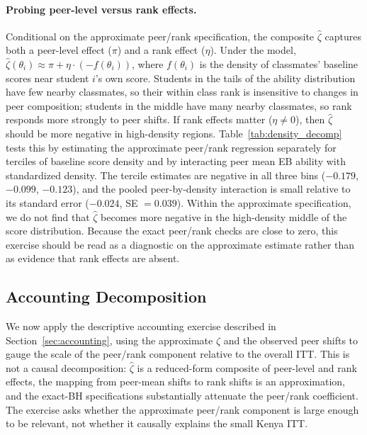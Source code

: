 \documentclass[11pt]{article}
\begin{document}
\paragraph{Probing peer-level versus rank effects.} Conditional on the approximate peer/rank specification, the composite $\hat{\zeta}$ captures both a peer-level effect ($\pi$) and a rank effect ($\eta$). Under the model, $\hat{\zeta}(\theta_i) \approx \pi + \eta \cdot (-f(\theta_i))$, where $f(\theta_i)$ is the density of classmates' baseline scores near student $i$'s own score. Students in the tails of the ability distribution have few nearby classmates, so their within class rank is insensitive to changes in peer composition; students in the middle have many nearby classmates, so rank responds more strongly to peer shifts. If rank effects matter ($\eta \neq 0$), then $\hat{\zeta}$ should be more negative in high-density regions. Table~\ref{tab:density_decomp} tests this by estimating the approximate peer/rank regression separately for terciles of baseline score density and by interacting peer mean EB ability with standardized density. The tercile estimates are negative in all three bins ($-0.179$, $-0.099$, $-0.123$), and the pooled peer-by-density interaction is small relative to its standard error ($-0.024$, SE $=0.039$). Within the approximate specification, we do not find that $\hat{\zeta}$ becomes more negative in the high-density middle of the score distribution. Because the exact peer/rank checks are close to zero, this exercise should be read as a diagnostic on the approximate estimate rather than as evidence that rank effects are absent.

\subsection{Accounting Decomposition}

We now apply the descriptive accounting exercise described in Section~\ref{sec:accounting}, using the approximate $\hat{\zeta}$ and the observed peer shifts to gauge the scale of the peer/rank component relative to the overall ITT\@. This is not a causal decomposition: $\hat{\zeta}$ is a reduced-form composite of peer-level and rank effects, the mapping from peer-mean shifts to rank shifts is an approximation, and the exact\mbox{-}BH specifications substantially attenuate the peer/rank coefficient. The exercise asks whether the approximate peer/rank component is large enough to be relevant, not whether it causally explains the small Kenya ITT\@.
\end{document}
